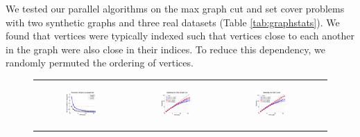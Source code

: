 \documentclass{article} %
\begin{document}
We tested our parallel algorithms on the max graph cut and set cover problems with two synthetic graphs and three real datasets (Table \ref{tab:graphstats}).
We found that vertices were typically indexed such that vertices close to each another in the graph were also close in their indices.
To reduce this dependency, we randomly permuted the ordering of vertices.


\begin{figure}[ht]
  \centering
  \begin{tabular}{cccc}
	  \begin{subfigure}[h]{0.30\textwidth}
	  	\includegraphics[width=130pt]{images/summary_relruntime.pdf}
			\caption{}
			\label{fig:relruntime}
	  \end{subfigure} &
	  \begin{subfigure}[h]{0.30\textwidth}
	  	\includegraphics[width=130pt]{images/summary_speedup_maxgraphcut.pdf}
			\caption{}
			\label{fig:speedup_maxgraphcut}
	  \end{subfigure} &
	  \begin{subfigure}[h]{0.30\textwidth}
	  	\includegraphics[width=130pt]{images/summary_speedup_setcover.pdf}

\end{subfigure}
\end{tabular}
\end{figure}
\end{document}
